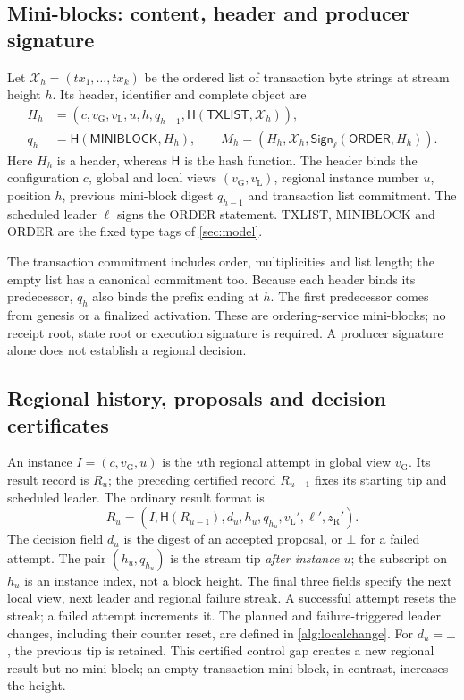 \documentclass[11pt,a4paper,onecolumn]{article}
\newcommand{\Hash}{\mathsf H}
\newcommand{\Sig}{\mathsf{Sign}}
\newcommand{\gv}{v_{\mathrm G}}
\newcommand{\lv}{v_{\mathrm L}}
\newcommand{\botv}{\bot}
\newcommand{\Tag}[1]{\mathsf{#1}}
\theoremstyle{remark}\newtheorem{example}[definition]{Example}
\begin{document}
\subsection{Mini-blocks: content, header and producer signature}\label{sec:miniblocks}
Let $\mathcal X_h=(tx_1,\ldots,tx_k)$ be the ordered list of transaction byte
strings at stream height $h$. Its header, identifier and complete object are
\begin{align}
 H_h&=(c,\gv,\lv,u,h,q_{h-1},\Hash(\Tag{TXLIST},\mathcal X_h)),\label{eq:block}\\
 q_h&=\Hash(\Tag{MINIBLOCK},H_h),\qquad
 M_h=(H_h,\mathcal X_h,\Sig_\ell(\Tag{ORDER},H_h)).\nonumber
\end{align}
Here $H_h$ is a header, whereas $\Hash$ is the hash function. The header binds
the configuration $c$, global and local views $(\gv,\lv)$, regional instance
number $u$, position $h$, previous mini-block digest $q_{h-1}$ and transaction
list commitment. The scheduled leader $\ell$ signs the ORDER statement.
TXLIST, MINIBLOCK and ORDER are the fixed type tags of \cref{sec:model}.

The transaction commitment includes order, multiplicities and list length;
the empty list has a canonical commitment too. Because each header binds its
predecessor, $q_h$ also binds the prefix ending at $h$. The first predecessor
comes from genesis or a finalized activation. These are ordering-service
mini-blocks; no receipt root, state root or execution signature is required.
A producer signature alone does not establish a regional decision.

\subsection{Regional history, proposals and decision certificates}\label{sec:regionalobjects}
An instance $I=(c,\gv,u)$ is the $u$th regional attempt in global view $\gv$.
Its result record is $R_u$; the preceding certified record $R_{u-1}$ fixes its
starting tip and scheduled leader. The ordinary result format is
\begin{equation}\label{eq:regionaloutcome}
 R_u=(I,\Hash(R_{u-1}),d_u,h_u,q_{h_u},\lv',\ell',z_{\mathrm R}').
\end{equation}
The decision field $d_u$ is the digest of an accepted proposal, or $\botv$ for a
failed attempt. The pair $(h_u,q_{h_u})$ is the stream tip \emph{after instance
$u$}; the subscript on $h_u$ is an instance index, not a block height.
The final three fields specify the next local view, next leader and regional
failure streak. A successful attempt resets the streak; a failed attempt
increments it. The planned and failure-triggered leader changes, including
their counter reset, are defined in \cref{alg:localchange}.
For $d_u=\botv$, the previous tip is retained. This certified control gap
creates a new regional result but no mini-block; an empty-transaction
mini-block, in contrast, increases the height.
\end{document}
